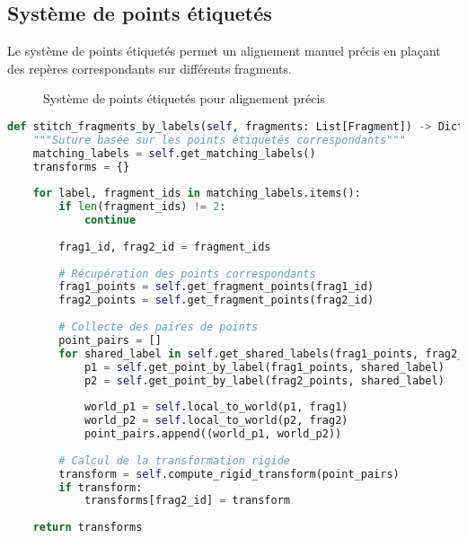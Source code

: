 \documentclass[12pt,a4paper]{report}
\begin{document}
\subsection{Système de points étiquetés}

Le système de points étiquetés permet un alignement manuel précis en plaçant des repères correspondants sur différents fragments.


\begin{figure}[H]
\centering
{}
\caption{Système de points étiquetés pour alignement précis}
\label{fig:points_etiquetes}
\end{figure}

\begin{lstlisting}[language=Python, caption=Algorithme d'alignement par points]
def stitch_fragments_by_labels(self, fragments: List[Fragment]) -> Dict[str, dict]:
    """Suture basée sur les points étiquetés correspondants"""
    matching_labels = self.get_matching_labels()
    transforms = {}
    
    for label, fragment_ids in matching_labels.items():
        if len(fragment_ids) != 2:
            continue
            
        frag1_id, frag2_id = fragment_ids
        
        # Récupération des points correspondants
        frag1_points = self.get_fragment_points(frag1_id)
        frag2_points = self.get_fragment_points(frag2_id)
        
        # Collecte des paires de points
        point_pairs = []
        for shared_label in self.get_shared_labels(frag1_points, frag2_points):
            p1 = self.get_point_by_label(frag1_points, shared_label)
            p2 = self.get_point_by_label(frag2_points, shared_label)
            
            world_p1 = self.local_to_world(p1, frag1)
            world_p2 = self.local_to_world(p2, frag2)
            point_pairs.append((world_p1, world_p2))
        
        # Calcul de la transformation rigide
        transform = self.compute_rigid_transform(point_pairs)
        if transform:
            transforms[frag2_id] = transform
    
    return transforms
\end{lstlisting}
\end{document}
